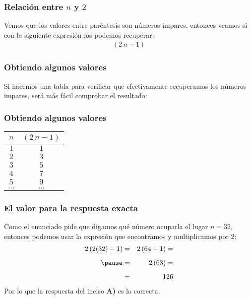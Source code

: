 \begin{frame}
\frametitle{Relación entre $n$ y $2$}
Vemos que los valores entre paréntesis son números impares, entonces veamos si con la siguiente expresión los podemos recuperar:
\pause
\begin{align*}
(2 \, n - 1)
\end{align*}
\end{frame}
\begin{frame}
\frametitle{Obtiendo algunos valores}
Si hacemos una tabla para verificar que efectivamente recuperamos los números impares, será más fácil comprobar el resultado:
\end{frame}
\begin{frame}
\frametitle{Obtiendo algunos valores}
\fontsize{12}{12}\selectfont
\begin{table}
\centering
\begin{tabular}{c | c}
$n$ & $(2 \, n - 1)$ \\ \hline
$1$ & $1$ \\ \hline
$2$ & $3$ \\ \hline
$3$ & $5$ \\ \hline
$4$ & $7$ \\ \hline
$5$ & $9$ \\ \hline
$\ldots$ & $\ldots$ \\ \hline
\end{tabular}
\end{table}
\end{frame}
\begin{frame}
\frametitle{El valor para la respuesta exacta}
Como el enunciado pide que digamos qué número ocuparla el lugar $n = 32$, entonces podemos usar la expresión que encontramos y multiplicamos por $2$:
\pause
\begin{eqnarray*}
2 \, (2 (32) - 1) &=& 2 \, (64 - 1) = \\[0.5em] \pause
&=& 2 \, (63) = \\[0.5em]
&=& 126
\end{eqnarray*}
\pause
Por lo que la respuesta del inciso \textbf{A)} es la correcta.
\end{frame}
